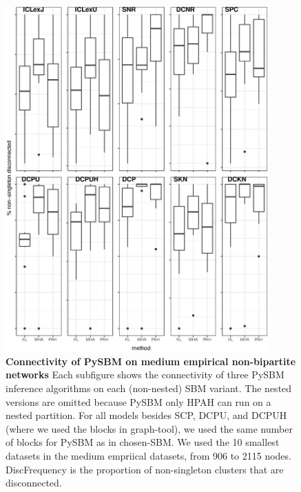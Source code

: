 \documentclass[aps,pre,superscriptaddress]{article}
\begin{document}
\begin{figure}[!htpb]
	\centering
	\includegraphics[width=0.9\textwidth]{figures/pysbm_conn_all.eps}
	\caption[]{
		\textbf{Connectivity of PySBM on medium empirical non-bipartite networks}
		Each subfigure shows the connectivity of three PySBM inference algorithms on each (non-nested) SBM variant.
		The nested versions are omitted because PySBM only HPAH can run on a nested partition.
		For all models besides SCP, DCPU, and DCPUH (where we used the blocks in graph-tool), we used the same number of blocks for PySBM as in chosen-SBM.
		We used the 10 smallest datasets in the medium empriical datasets, from 906 to 2115 nodes.
		DiscFrequency is the proportion of non-singleton clusters that are disconnected.
	}
	\label{fig:pysbm_disc.pdf}
\end{figure}
\end{document}

